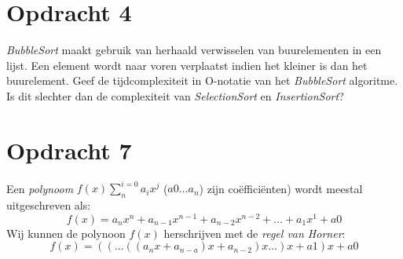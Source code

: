 \section{Opdracht 4}
\emph{BubbleSort} maakt gebruik van herhaald verwisselen van buurelementen in een lijst. Een element wordt naar voren verplaatst indien het kleiner is dan het buurelement. Geef de tijdcomplexiteit in O-notatie van het \emph{BubbleSort} algoritme. Is dit slechter dan de complexiteit van \emph{SelectionSort} en \emph{InsertionSort}?

\section{Opdracht 7}
Een \emph{polynoom} $f(x)\sum_{n}^{i=0} a_ix^j$ ($a0\ldots a_n$) zijn co\"{e}ffici\"{e}nten) wordt meestal uitgeschreven als:
\begin{displaymath}
f(x)=a_nx^n+a_{n-1}x^{n-1}+a_{n-2}x^{n-2}+\ldots +a_1x^1+a0
\end{displaymath}
Wij kunnen de polynoon $f(x)$ herschrijven met de \emph{regel van Horner}:
\begin{displaymath}
  f(x)=((\ldots((a_nx+a_{n-a})x+a_{n-2})x\ldots)x+a1)x+a0
\end{displaymath}

